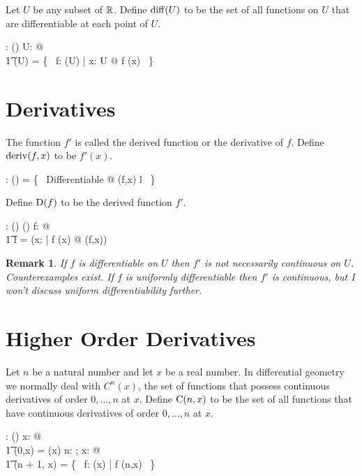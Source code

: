 \documentclass[11pt, oneside]{article}
\newtheorem*{remark}{Remark}
\begin{document}
Let $U$ be any subset of $\mathbb{R}$. 
Define $\operatorname{diff}(U)$ to be the set of all functions on $U$
that are differentiable at each point of $U$.
\begin{axdef}
	\diffPR: \power \R \fun \power(\R \pfun \R)
\where
	\forall U: \power \R @ \\
	\t1	\diffPR(U) = \{~ f: \CzeroPR(U) | \forall x: U @ f \in \diffR(x) ~\}
\end{axdef}

\section{Derivatives}

The function $f'$ is called the derived function or the derivative of $f$.
Define $\operatorname{deriv}(f,x)$ to be $f'(x)$.
\begin{axdef}
	\derivFR: (\R \pfun \R) \cross \R \pfun \R
\where
	\derivFR = \{~ Differentiable @ (f,x) \mapsto l ~\}
\end{axdef}

Define $\operatorname{D}(f)$ to be the derived function $f'$.
\begin{axdef}
	\derivF: (\R \pfun \R) \fun (\R \pfun \R)
\where
	\forall f: \R \pfun \R @ \\
		\t1	\derivF f = (\lambda x: \R | f \in \diffR(x) @ \derivFR(f,x)) 
\end{axdef}

\begin{remark}
If $f$ is differentiable on $U$ then $f'$ is not necessarily continuous on $U$.
Counterexamples exist.
If $f$ is uniformly differentiable then $f'$ is continuous, but I won't discuss uniform differentiability further.
\end{remark}

\section{Higher Order Derivatives}

Let $n$ be a natural number and let $x$ be a real number.
In differential geometry we normally deal with $C^n(x)$, the set of functions
that possess continuous derivatives of order $0, \ldots, n$ at $x$.
Define $\operatorname{C}(n,x)$ to be the set of all functions that have continuous derivatives of order $0, \ldots, n$ at $x$.
\begin{axdef}
	\CnR: \nat \cross \R \fun \power(\R \pfun \R)
\where
	\forall x: \R @ \\
	\t1	\CnR(0,x) = \CzeroR(x)
\also
	\forall n: \nat; x: \R @ \\
	\t1	\CnR(n + 1, x) = \{~ f: \CzeroR(x) | \derivF f \in \CnR(n,x) ~\}
\end{axdef}
\end{document}

